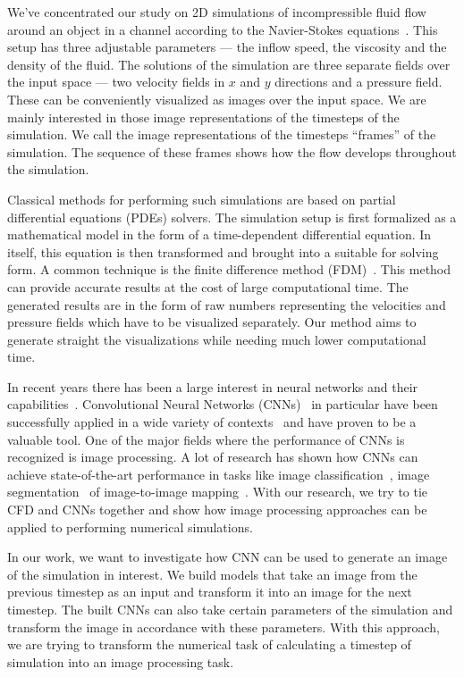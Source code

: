 \documentclass{llncs}
\begin{document}
We've concentrated our study on 2D simulations of incompressible fluid flow around an object in a channel according to the Navier-Stokes equations~\cite{bistafa2018}. This setup has three adjustable parameters --- the inflow speed, the viscosity and the density of the fluid. The solutions of the simulation are three separate fields over the input space --- two velocity fields in $x$ and $y$ directions and a pressure field. These can be conveniently visualized as images over the input space. We are mainly interested in those image representations of the timesteps of the simulation. We call the image representations of the timesteps ``frames'' of the simulation. The sequence of these frames shows how the flow develops throughout the simulation.

Classical methods for performing such simulations are based on partial differential equations (PDEs) solvers. The simulation setup is first formalized as a mathematical model in the form of a time-dependent differential equation. In itself, this equation is then transformed and brought into a suitable for solving form. A common technique is the finite difference method (FDM)~\cite{bashar2011,petersson2018,zhang2014,nahit2011}. This method can provide accurate results at the cost of large computational time. The generated results are in the form of raw numbers representing the velocities and pressure fields which have to be visualized separately. Our method aims to generate straight the visualizations while needing much lower computational time.

In recent years there has been a large interest in neural networks and their capabilities~\cite{krizhevsky2012,simonyan2014,zeiler2011,liu2017,ronneberger2015}. Convolutional Neural Networks (CNNs)~\cite{long2014} in particular have been successfully applied in a wide variety of contexts~\cite{eremeev2019,schulz2019,zhangyang2019,yang2019} and have proven to be a valuable tool. One of the major fields where the performance of CNNs is recognized is image processing. A lot of research has shown how CNNs can achieve state-of-the-art performance in tasks like image classification~\cite{xie2019,xie2016aggregated,he2015}, image segmentation~\cite{xie2016aggregated,choi2020cars} of image-to-image mapping~\cite{liu2017,radford2015,park2019}. With our research, we try to tie CFD and CNNs together and show how image processing approaches can be applied to performing numerical simulations.

In our work, we want to investigate how CNN can be used to generate an image of the simulation in interest. We build models that take an image from the previous timestep as an input and transform it into an image for the next timestep. The built CNNs can also take certain parameters of the simulation and transform the image in accordance with these parameters. With this approach, we are trying to transform the numerical task of calculating a timestep of simulation into an image processing task.
\end{document}
